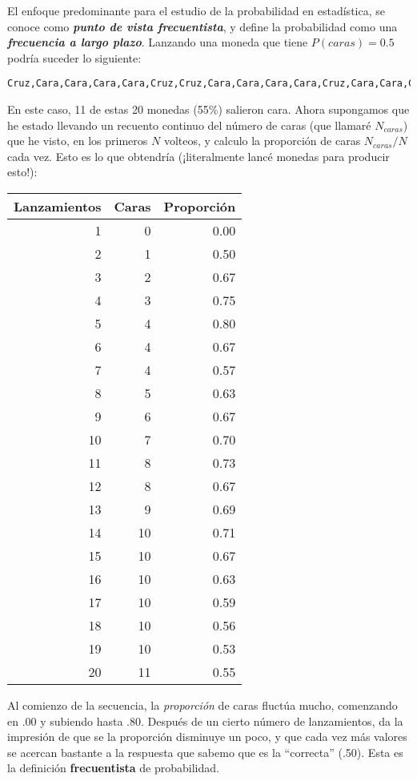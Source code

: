 \documentclass[
]{book}
\begin{document}
El enfoque predominante para el estudio de la probabilidad en estadística, se conoce como \textbf{\emph{punto de vista frecuentista}}, y define la probabilidad como una \textbf{\emph{frecuencia a largo plazo}}. Lanzando una moneda que tiene \(P(caras) = 0.5\) podría suceder lo siguiente:

\begin{verbatim}
Cruz,Cara,Cara,Cara,Cara,Cruz,Cruz,Cara,Cara,Cara,Cara,Cruz,Cara,Cara,Cruz,Cruz,Cruz,Cruz,Cruz,Cara
\end{verbatim}

En este caso, 11 de estas 20 monedas (55\%) salieron cara. Ahora supongamos que he estado llevando un recuento continuo del número de caras (que llamaré \(N_{caras}\)) que he visto, en los primeros \(N\) volteos, y calculo la proporción de caras \(N_{caras}/N\) cada vez. Esto es lo que obtendría (¡literalmente lancé monedas para producir esto!):

\begin{tabular}{r|r|r}
\hline
Lanzamientos & Caras & Proporción\\
\hline
1 & 0 & 0.00\\
\hline
2 & 1 & 0.50\\
\hline
3 & 2 & 0.67\\
\hline
4 & 3 & 0.75\\
\hline
5 & 4 & 0.80\\
\hline
6 & 4 & 0.67\\
\hline
7 & 4 & 0.57\\
\hline
8 & 5 & 0.63\\
\hline
9 & 6 & 0.67\\
\hline
10 & 7 & 0.70\\
\hline
11 & 8 & 0.73\\
\hline
12 & 8 & 0.67\\
\hline
13 & 9 & 0.69\\
\hline
14 & 10 & 0.71\\
\hline
15 & 10 & 0.67\\
\hline
16 & 10 & 0.63\\
\hline
17 & 10 & 0.59\\
\hline
18 & 10 & 0.56\\
\hline
19 & 10 & 0.53\\
\hline
20 & 11 & 0.55\\
\hline
\end{tabular}

Al comienzo de la secuencia, la \emph{proporción} de caras fluctúa mucho, comenzando en .00 y subiendo hasta .80. Después de un cierto número de lanzamientos, da la impresión de que se la proporción disminuye un poco, y que cada vez más valores se acercan bastante a la respuesta que sabemo que es la ``correcta'' (.50). Esta es la definición \textbf{frecuentista} de probabilidad.
\end{document}
